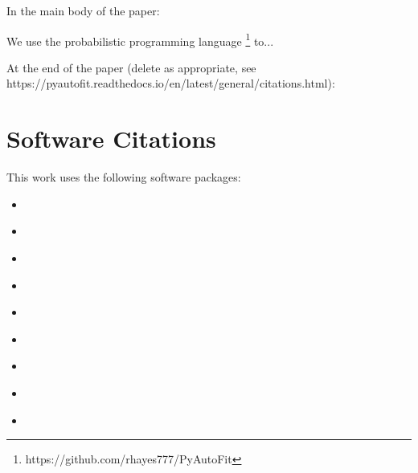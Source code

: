 In the main body of the paper:

We use the probabilistic programming language \footnote{https://github.com/rhayes777/PyAutoFit} \citep{pyautofit} to...

At the end of the paper (delete as appropriate, see https://pyautofit.readthedocs.io/en/latest/general/citations.html):

\section*{Software Citations}

This work uses the following software packages:

\begin{itemize}

\item
\href{https://github.com/dfm/corner.py}{}
\citep{corner2016}

\item
\href{https://github.com/joshspeagle/dynesty}{}
\citep{dynesty}

\item
\href{https://github.com/dfm/emcee}{}
\citep{emcee}

\item
\href{https://github.com/matplotlib/matplotlib}{}
\citep{matplotlib}

\item
\href{https://github.com/numpy/numpy}{}
\citep{numpy}

\item
\href{https://github.com/JohannesBuchner/PyMultiNest}{}
\citep{multinest, pymultinest}

\item
\href{https://github.com/ljvmiranda921/pyswarms}{}
\citep{pyswarms}

\item
\href{https://www.python.org/}{}
\citep{python}

\item
\href{https://github.com/scipy/scipy}{}
\citep{scipy}

\end{itemize}